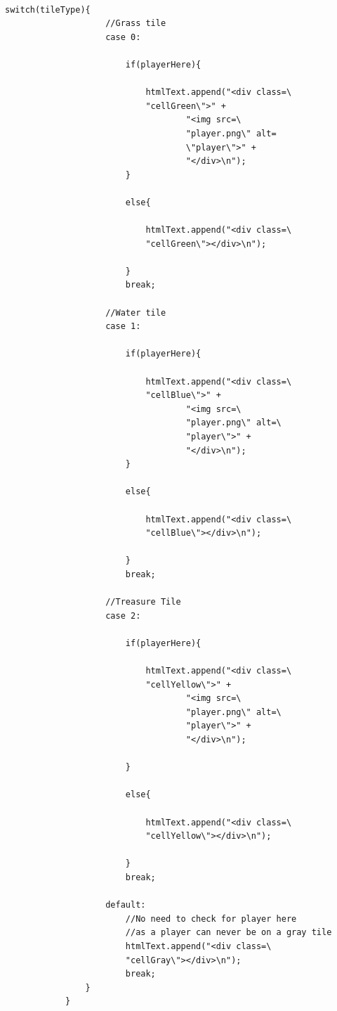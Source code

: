 \documentclass[a4paper,12pt]{extarticle}
\begin{document}
\begin{lstlisting}

switch(tileType){
                    //Grass tile
                    case 0:

                        if(playerHere){

                            htmlText.append("<div class=\
                            "cellGreen\">" +
                                    "<img src=\
                                    "player.png\" alt=
                                    \"player\">" +
                                    "</div>\n");
                        }

                        else{

                            htmlText.append("<div class=\
                            "cellGreen\"></div>\n");

                        }
                        break;

                    //Water tile
                    case 1:

                        if(playerHere){

                            htmlText.append("<div class=\
                            "cellBlue\">" +
                                    "<img src=\
                                    "player.png\" alt=\
                                    "player\">" +
                                    "</div>\n");
                        }

                        else{

                            htmlText.append("<div class=\
                            "cellBlue\"></div>\n");

                        }
                        break;

                    //Treasure Tile
                    case 2:

                        if(playerHere){

                            htmlText.append("<div class=\
                            "cellYellow\">" +
                                    "<img src=\
                                    "player.png\" alt=\
                                    "player\">" +
                                    "</div>\n");

                        }

                        else{

                            htmlText.append("<div class=\
                            "cellYellow\"></div>\n");

                        }
                        break;

                    default:
                        //No need to check for player here
                        //as a player can never be on a gray tile
                        htmlText.append("<div class=\
                        "cellGray\"></div>\n");
                        break;
                }
            }

\end{lstlisting}
\vspace{4mm}
\end{document}
